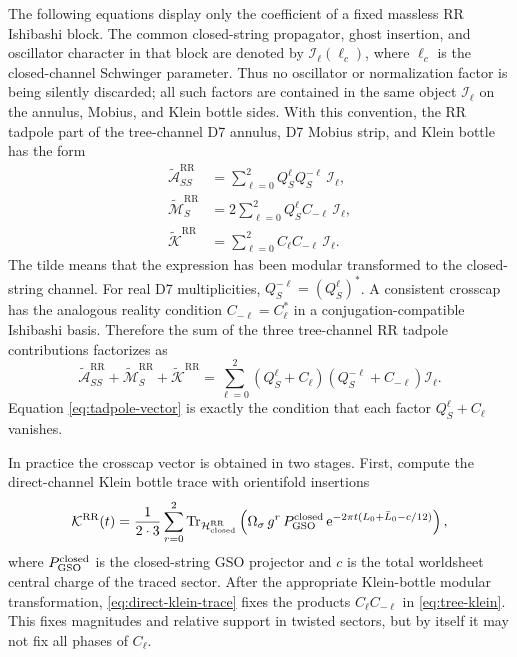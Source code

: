 \documentclass[11pt]{article}
\newcommand{\cH}{\mathcal{H}}
\newcommand{\RR}{\mathrm{RR}}
\newcommand{\orient}{\Omega_\sigma}
\newcommand{\e}{\mathrm{e}}
\begin{document}
The following equations display only the coefficient of a fixed massless RR Ishibashi block.
The common closed-string propagator, ghost insertion, and oscillator character in that block are
denoted by $\mathcal I_\ell(\ell_c)$, where $\ell_c$ is the closed-channel Schwinger parameter.
Thus no oscillator or normalization factor is being silently discarded; all such factors are
contained in the same object $\mathcal I_\ell$ on the annulus, Mobius, and Klein bottle sides.
With this convention, the RR tadpole part of the tree-channel D7 annulus, D7 Mobius strip, and
Klein bottle has the form
\begin{align}
  \widetilde{\mathcal A}_{SS}^{\RR}
  &=
  \sum_{\ell=0}^{2} Q_S^\ell Q_S^{-\ell}\,\mathcal I_\ell,
  \label{eq:tree-annulus-SS}
  \\
  \widetilde{\mathcal M}_{S}^{\RR}
  &=
  2\sum_{\ell=0}^{2} Q_S^\ell C_{-\ell}\,\mathcal I_\ell,
  \label{eq:tree-mobius-S}
  \\
  \widetilde{\mathcal K}^{\RR}
  &=
  \sum_{\ell=0}^{2} C_\ell C_{-\ell}\,\mathcal I_\ell.
  \label{eq:tree-klein}
\end{align}
The tilde means that the expression has been modular transformed to the closed-string channel.
For real D7 multiplicities, $Q_S^{-\ell}=(Q_S^\ell)^*$. A consistent crosscap has the analogous
reality condition $C_{-\ell}=C_\ell^*$ in a conjugation-compatible Ishibashi basis. Therefore the
sum of the three tree-channel RR tadpole contributions factorizes as
\begin{equation}
  \widetilde{\mathcal A}_{SS}^{\RR}
  +\widetilde{\mathcal M}_{S}^{\RR}
  +\widetilde{\mathcal K}^{\RR}
  =
  \sum_{\ell=0}^{2}
  \left(Q_S^\ell+C_\ell\right)
  \left(Q_S^{-\ell}+C_{-\ell}\right)
  \mathcal I_\ell.
  \label{eq:tadpole-factorization}
\end{equation}
Equation \eqref{eq:tadpole-vector} is exactly the condition that each factor
$Q_S^\ell+C_\ell$ vanishes.

In practice the crosscap vector is obtained in two stages.
First, compute the direct-channel Klein bottle trace with orientifold insertions
\begin{equation}
  \mathcal K^{\RR}(t)
  =
  \frac{1}{2\cdot 3}
  \sum_{r=0}^{2}
  \operatorname{Tr}_{\cH_{\rm closed}^{\RR}}
  \left(
    \orient\, g^r\,P_{\rm GSO}^{\rm closed}\,
    \e^{-2\pi t(L_0+\bar L_0-c/12)}
  \right),
  \label{eq:direct-klein-trace}
\end{equation}
where $P_{\rm GSO}^{\rm closed}$ is the closed-string GSO projector and $c$ is the total
worldsheet central charge of the traced sector. After the appropriate Klein-bottle modular
transformation, \eqref{eq:direct-klein-trace} fixes the products $C_\ell C_{-\ell}$ in
\eqref{eq:tree-klein}. This fixes magnitudes and relative support in twisted sectors, but by
itself it may not fix all phases of $C_\ell$.
\end{document}
